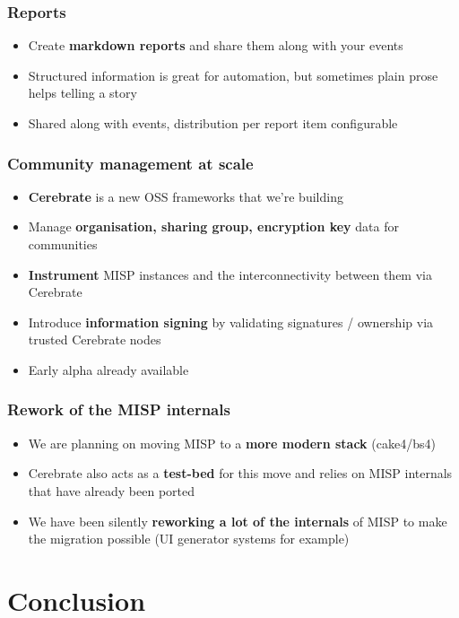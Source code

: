 \begin{frame}
\frametitle{Reports}
\begin{itemize}
	\item Create {\bf markdown reports} and share them along with your events
        \item Structured information is great for automation, but sometimes plain prose helps telling a story
        \item Shared along with events, distribution per report item configurable
\end{itemize}
\end{frame}

\begin{frame}
\frametitle{Community management at scale}
\begin{itemize}
	\item {\bf Cerebrate} is a new OSS frameworks that we're building
        \item Manage {\bf organisation, sharing group, encryption key} data for communities
        \item {\bf Instrument} MISP instances and the interconnectivity between them via Cerebrate
        \item Introduce {\bf information signing} by validating signatures / ownership via trusted Cerebrate nodes
        \item Early alpha already available
\end{itemize}
\end{frame}

\begin{frame}
\frametitle{Rework of the MISP internals}
\begin{itemize}
	\item We are planning on moving MISP to a {\bf more modern stack} (cake4/bs4)
        \item Cerebrate also acts as a {\bf test-bed} for this move and relies on MISP internals that have already been ported
        \item We have been silently {\bf reworking a lot of the internals} of MISP to make the migration possible (UI generator systems for example)
\end{itemize}
\end{frame}

\section{Conclusion}

